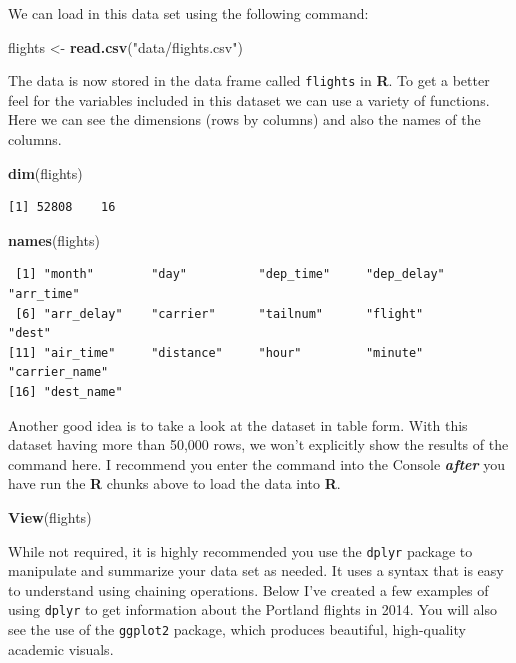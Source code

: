 \documentclass [11pt, proquest] {uwthesis}[2015/03/03]
\newenvironment{Shaded}{}{}
\newcommand{\KeywordTok}[1]{\textcolor[rgb]{0.00,0.44,0.13}{\textbf{{#1}}}}
\newcommand{\StringTok}[1]{\textcolor[rgb]{0.25,0.44,0.63}{{#1}}}
\newcommand{\NormalTok}[1]{{#1}}
\begin{document}
We can load in this data set using the following command:
\begin{Shaded}
\begin{Highlighting}[]
\NormalTok{flights <-}\StringTok{ }\KeywordTok{read.csv}\NormalTok{(}\StringTok{"data/flights.csv"}\NormalTok{)}
\end{Highlighting}
\end{Shaded}
The data is now stored in the data frame called \texttt{flights} in
\textbf{R}. To get a better feel for the variables included in this
dataset we can use a variety of functions. Here we can see the
dimensions (rows by columns) and also the names of the columns.
\begin{Shaded}
\begin{Highlighting}[]
\KeywordTok{dim}\NormalTok{(flights)}
\end{Highlighting}
\end{Shaded}
\begin{verbatim}
[1] 52808    16
\end{verbatim}
\begin{Shaded}
\begin{Highlighting}[]
\KeywordTok{names}\NormalTok{(flights)}
\end{Highlighting}
\end{Shaded}
\begin{verbatim}
 [1] "month"        "day"          "dep_time"     "dep_delay"    "arr_time"    
 [6] "arr_delay"    "carrier"      "tailnum"      "flight"       "dest"        
[11] "air_time"     "distance"     "hour"         "minute"       "carrier_name"
[16] "dest_name"   
\end{verbatim}
Another good idea is to take a look at the dataset in table form. With
this dataset having more than 50,000 rows, we won't explicitly show the
results of the command here. I recommend you enter the command into the
Console \textbf{\emph{after}} you have run the \textbf{R} chunks above
to load the data into \textbf{R}.
\begin{Shaded}
\begin{Highlighting}[]
\KeywordTok{View}\NormalTok{(flights)}
\end{Highlighting}
\end{Shaded}
While not required, it is highly recommended you use the \texttt{dplyr}
package to manipulate and summarize your data set as needed. It uses a
syntax that is easy to understand using chaining operations. Below I've
created a few examples of using \texttt{dplyr} to get information about
the Portland flights in 2014. You will also see the use of the
\texttt{ggplot2} package, which produces beautiful, high-quality
academic visuals.
\end{document}
